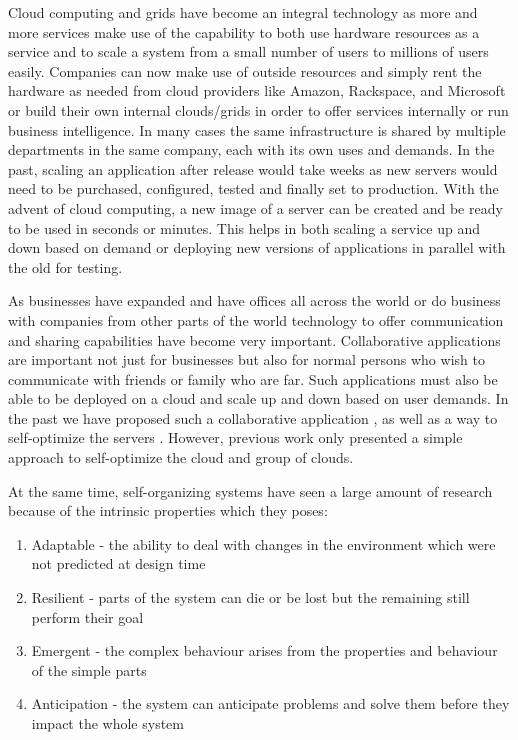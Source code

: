 \documentclass{sig-alternate}
\begin{document}
Cloud computing and grids have become an integral technology as more and more services make use of the capability to both use hardware resources as a service and to scale a system from a small number of users to millions of users easily. Companies can now make use of outside resources and simply rent the hardware as needed from cloud providers like Amazon, Rackspace, and Microsoft or build their own internal clouds/grids in order to offer services internally or run business intelligence. In many cases the same infrastructure is shared by multiple departments in the same company, each with its own uses and demands. In the past, scaling an application after release would take weeks as new servers would need to be purchased, configured, tested and finally set to production. With the advent of cloud computing, a new image of a server can be created and be ready to be used in seconds or minutes. This helps in both scaling a service up and down based on demand or deploying new versions of applications in parallel with the old for testing.

As businesses have expanded and have offices all across the world or do business with companies from other parts of the world technology to offer communication and sharing capabilities have become very important. Collaborative applications are important not just for businesses but also for normal persons who wish to communicate with friends or family who are far. Such applications must also be able to be deployed on a cloud and scale up and down based on user demands. In the past we have proposed such a collaborative application \cite{bogdan:cts2012}, \cite{bogdan:miles2012chapter} as well as a way to self-optimize the servers \cite{bogdan:amgcc2013}. However, previous work only presented a simple approach to self-optimize the cloud and group of clouds.

At the same time, self-organizing systems have seen a large amount of research because of the intrinsic properties which they poses:
\begin{enumerate}
\item Adaptable - the ability to deal with changes in the environment which were not predicted at design time
\item Resilient - parts of the system can die or be lost but the remaining still perform their goal
\item Emergent - the complex behaviour arises from the properties and behaviour of the simple parts
\item Anticipation - the system can anticipate problems and solve them before they impact the whole system
\end{enumerate}
\end{document}
